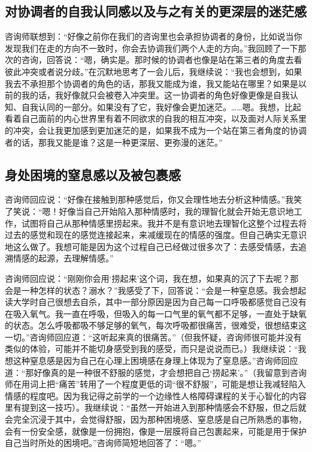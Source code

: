 





\subsection*{对协调者的自我认同感以及与之有关的更深层的迷茫感}

咨询师联想到：“好像之前你在我们的咨询里也会承担协调者的身份，比如说当你发现我们在走的方向不一致时，你会去协调我们两个人走的方向。”我回顾了一下那次的咨询，回答说：“嗯，确实是。那时候的协调者也像是站在第三者的角度去看彼此冲突或者说分歧。”在沉默地思考了一会儿后，我继续说：“我也会想到，如果我去不承担那个协调者的角色的话，那我又能成为谁，我又能站在哪里？如果是以前的我的话，我好像就只会被卷入冲突里。这一协调者的角色好像更像是自我认知、自我认同的一部分。如果没有了它，我好像会更加迷茫。……嗯。我想，比起看着自己面前的内心世界里有着不同欲求的自我的相互冲突，以及面对人际关系里的冲突，会让我更加感到更加迷茫的是，如果我不成为一个站在第三者角度的协调者的话，那我又能是谁？这是一种更深层、更弥漫的迷茫。”







\subsection*{身处困境的窒息感以及被包裹感}

咨询师回应说：“好像在接触到那种感觉后，你又会理性地去分析这种情感。”我笑了笑说：“嗯！好像当自己开始陷入那种情感时，我的理智化就会开始无意识地工作，试图将自己从那种情感里捞起来。我并不是有意识地去理智化这整个过程\pozhehao{}去将过去的感觉和现在的感觉连接起来，来减缓现在的情感的强度。但自己确实无意识地这么做了。我想可能是因为这个过程自己已经做过很多次了：去感受情感，去追溯情感的起源，去理解情感。”

咨询师回应说：“刚刚你会用‘捞起来’这个词，我在想，如果真的沉了下去呢？那会是一种怎样的状态？溺水？”我感受了下，回答说：“会是一种窒息感。我会想起读大学时自己很想去自杀，其中一部分原因是因为自己每一口呼吸都感觉自己没有在吸入氧气。我一直在呼吸，但吸入的每一口气里的氧气都不足够，一直处于缺氧的状态。怎么呼吸都吸不够足够的氧气，每次呼吸都很痛苦，很难受，很想结束这一切。”咨询师回应道：“这听起来真的很痛苦。”（但我怀疑，咨询师很可能并没有类似的体验，可能并不能切身感受到我的感受，而只是说说而已。）我继续说：“我想这种窒息感是因为自己在心理上困境感在身理上体现为了窒息感。”咨询师回应道：“那好像真的是一种很不舒服的感觉，才会想把自己‘捞起来’。”（我留意到咨询师在用词上把“痛苦”转用了一个程度更低的词“很不舒服”，可能是想让我减轻陷入情感的程度吧。因为我记得之前学的一个边缘性人格障碍课程的关于心智化的内容里有提到这一技巧）。我继续说：“虽然一开始进入到那种情感会不舒服，但之后就会完全沉浸于其中，会觉得舒服，因为那种困境感、窒息感是自己所熟悉的事物，会有一份安全感，就像是一份拥抱，像是一层膜将自己包裹起来，可能是用于保护自己当时所处的困境吧。”咨询师简短地回答了：“嗯。”

